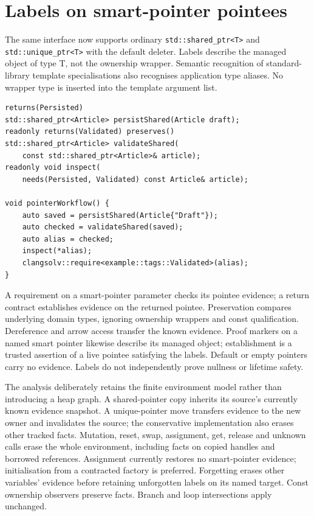\documentclass[11pt]{article}
\begin{document}
\section{Labels on smart-pointer pointees}
The same interface now supports ordinary \texttt{std::shared\_ptr<T>} and
\texttt{std::unique\_ptr<T>} with the default deleter. Labels describe the
managed object of type T, not the ownership wrapper. Semantic recognition of
standard-library template specialisations also recognises application type
aliases. No wrapper type is inserted into the template argument list.

\begin{lstlisting}
returns(Persisted)
std::shared_ptr<Article> persistShared(Article draft);
readonly returns(Validated) preserves()
std::shared_ptr<Article> validateShared(
    const std::shared_ptr<Article>& article);
readonly void inspect(
    needs(Persisted, Validated) const Article& article);

void pointerWorkflow() {
    auto saved = persistShared(Article{"Draft"});
    auto checked = validateShared(saved);
    auto alias = checked;
    inspect(*alias);
    clangsolv::require<example::tags::Validated>(alias);
}
\end{lstlisting}

A requirement on a smart-pointer parameter checks its pointee evidence; a
return contract establishes evidence on the returned pointee. Preservation
compares underlying domain types, ignoring ownership wrappers and const
qualification. Dereference and arrow access transfer the known evidence.
Proof markers on a named smart pointer likewise describe its managed object;
establishment is a trusted assertion of a live pointee satisfying the labels.
Default or empty pointers carry no evidence. Labels do not independently prove
nullness or lifetime safety.

The analysis deliberately retains the finite environment model rather than
introducing a heap graph. A shared-pointer copy inherits its source's currently
known evidence snapshot. A unique-pointer move transfers evidence to the new
owner and invalidates the source; the conservative implementation also erases
other tracked facts. Mutation, reset, swap, assignment, get, release and unknown
calls erase the whole environment, including facts on copied handles and
borrowed references. Assignment currently restores no smart-pointer evidence;
initialisation from a contracted factory is preferred. Forgetting erases other
variables' evidence before retaining unforgotten labels on its named target.
Const ownership observers preserve facts. Branch and loop intersections apply
unchanged.
\end{document}
